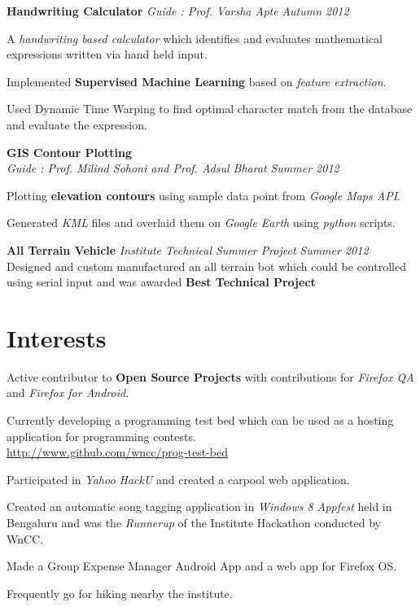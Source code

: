 \documentclass[margin,11pt]{resume}
\begin{document}
\begin{resume}
\textbf{Handwriting Calculator} \hfill
    \textsl{Guide : Prof. Varsha Apte} \hfill \emph{Autumn 2012}
\begin{list2}
\item A\emph{ handwriting based calculator} which identifies and evaluates mathematical expressions written via hand held input.
\item Implemented \textbf{Supervised Machine Learning} based on \emph{feature extraction}. 
\item Used Dynamic Time Warping to find optimal character match from the database and evaluate the expression.
\end{list2}

\textbf{GIS Contour Plotting}\\
  \textsl{Guide : Prof. Milind Sohoni and Prof. Adsul Bharat} \hfill \emph{Summer 2012}
\begin{list2}
\item Plotting \textbf{elevation contours} using sample data point from \emph{Google Maps API}.
\item Generated \emph{KML} files and overlaid them on \emph{Google Earth} using \emph{python} scripts. \\
\end{list2}

\textbf{All Terrain Vehicle} \hfill
\textsl{Institute Technical Summer Project} \hfill \emph{Summer 2012} \\ 
Designed and custom manufactured an all terrain bot which could be controlled using serial input and was awarded \textbf{Best Technical Project}

\section{\mysidestyle Interests}

\begin{list2}
\item Active contributor to \textbf{Open Source Projects} with contributions for \emph{Firefox QA} and \emph{Firefox for Android}.
\item Currently developing a programming test bed which can be used as a hosting application for programming contests.\\ \url{http://www.github.com/wncc/prog-test-bed} 
\item Participated in \emph{Yahoo HackU} and created a carpool web application.
\item Created an automatic song tagging application in \emph{Windows 8 Appfest} held in Bengaluru and was the \emph{Runnerup} of the Institute Hackathon conducted by WnCC.
\item Made a Group Expense Manager Android App and a web app for Firefox OS.
\item Frequently go for hiking nearby the institute.
\end{list2}


\end{resume}
\end{document}
